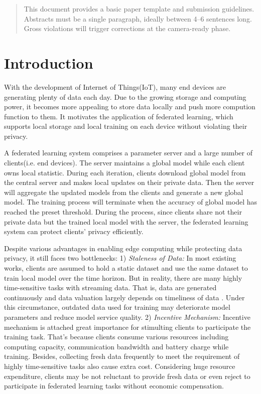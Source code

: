 \documentclass{article}
\theoremstyle{plain}
\theoremstyle{definition}
\theoremstyle{remark}
\begin{document}
\printAffiliationsAndNotice{\icmlEqualContribution} %

\begin{abstract}
This document provides a basic paper template and submission guidelines.
Abstracts must be a single paragraph, ideally between 4--6 sentences long.
Gross violations will trigger corrections at the camera-ready phase.
\end{abstract}


\section{Introduction}
\label{Introduction}
With the development of Internet of Things(IoT), many end devices are generating plenty of data each day.
Due to the growing storage and computing power, it becomes more appealing to store data locally and push more compution function to them.
It motivates the application of federated learning, which supports local storage and local training on each device without violating their privacy.

A federated learning system comprises a parameter server and a large number of clients(i.e. end devices).
The server maintains a global model while each client owns local statistic.
During each iteration, clients download global model from the central server and makes local updates on their private data. Then the server will aggregate the updated models from the clients and generate a new global model.
The training process will terminate when the accuracy of global model has reached the preset threshold.
During the process, since clients share not their private data but the trained local model with the server, the federated learning system can protect clients' privacy efficiently.

Despite various advantages in enabling edge computing while protecting data privacy, it still faces two bottlenecks:
1) \textit{Staleness of Data:} In most existing works, clients are assumed to hold a static dataset and use the same dataset to train local model over the time horizon.
But in reality, there are many highly time-sensitive tasks with streaming data. That is, data are generated continuously and data valuation largely depends on timeliness of data \cite{xiao2023aoi}.
Under this circumstance, outdated data used for training may deteriorate model parameters and reduce model service quality.
2) \textit{Incentive Mechanism:} Incentive mechanism is attached great importance for stimulting clients to participate the training task. That's because clients consume various resources including computing capacity, communication bandwidth and battery charge while training.
Besides, collecting fresh data frequently to meet the requirement of highly time-sensitive tasks also cause extra cost. Considering huge resource expenditure, clients may be not reluctant to provide fresh data or even reject to participate in federated learning tasks without economic compensation.
\end{document}
